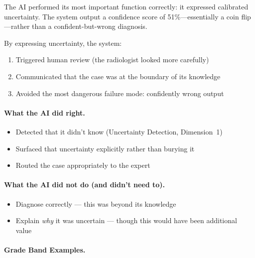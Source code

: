 The AI performed its most important function correctly: it expressed calibrated uncertainty. The system output a confidence score of 51\%---essentially a coin flip---rather than a confident-but-wrong diagnosis.

By expressing uncertainty, the system:
\begin{enumerate}
    \item Triggered human review (the radiologist looked more carefully)
    \item Communicated that the case was at the boundary of its knowledge
    \item Avoided the most dangerous failure mode: confidently wrong output
\end{enumerate}

\paragraph{What the AI did right.}
\begin{itemize}
    \item Detected that it didn't know (Uncertainty Detection, Dimension~1)
    \item Surfaced that uncertainty explicitly rather than burying it
    \item Routed the case appropriately to the expert
\end{itemize}

\paragraph{What the AI did not do (and didn't need to).}
\begin{itemize}
    \item Diagnose correctly --- this was beyond its knowledge
    \item Explain \emph{why} it was uncertain --- though this would have been additional value
\end{itemize}

\paragraph{Grade Band Examples.}

